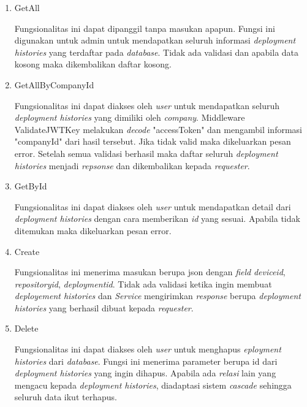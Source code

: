 \begin{enumerate}
    \item GetAll

          Fungsionalitas ini dapat dipanggil tanpa masukan apapun. Fungsi ini digunakan untuk admin untuk mendapatkan seluruh informasi \textit{deployment histories} yang terdaftar pada \textit{database}. Tidak ada validasi dan apabila data kosong maka dikembalikan daftar kosong.

    \item GetAllByCompanyId

          Fungsionalitas ini dapat diakses oleh \textit{user} untuk mendapatkan seluruh \textit{deployment histories} yang dimiliki oleh \textit{company}. Middleware ValidateJWTKey melakukan \textit{decode} "accessToken" dan mengambil informasi "companyId" dari hasil tersebut. Jika tidak valid maka dikeluarkan pesan error. Setelah semua validasi berhasil maka daftar seluruh \textit{deployment histories} menjadi \textit{repsonse} dan dikembalikan kepada \textit{requester}.

    \item GetById

          Fungsionalitas ini dapat diakses oleh \textit{user} untuk mendapatkan detail dari \textit{deployment histories} dengan cara memberikan \textit{id} yang sesuai. Apabila tidak ditemukan maka dikeluarkan pesan error.

    \item Create

          Fungsionalitas ini menerima masukan berupa json dengan \textit{field} \textit{device\textunderscore id}, \textit{repository\textunderscore id}, \textit{deployment\textunderscore id}. Tidak ada validasi ketika ingin membuat \textit{deployement histories} dan \textit{Service} mengirimkan \textit{response} berupa \textit{deployment histories} yang berhasil dibuat kepada \textit{requester}.

    \item Delete

          Fungsionalitas ini dapat diakses oleh \textit{user} untuk menghapus \textit{eployment histories} dari \textit{database}. Fungsi ini menerima parameter berupa id dari \textit{deployment histories} yang ingin dihapus. Apabila ada \textit{relasi} lain yang mengacu kepada \textit{deployment histories}, diadaptasi sistem \textit{cascade} sehingga seluruh data ikut terhapus.

\end{enumerate}

